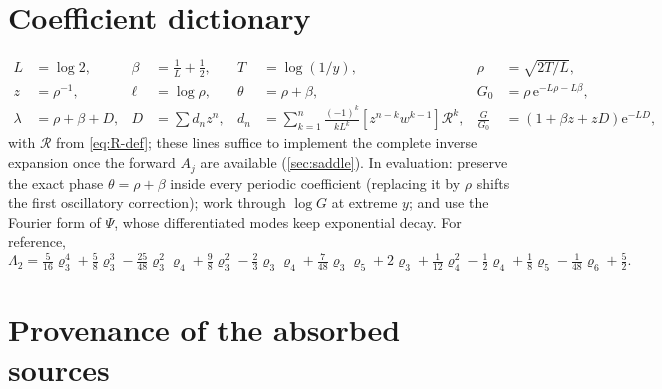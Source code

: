\documentclass[11pt,oneside]{article}
\numberwithin{equation}{section}
\theoremstyle{definition}
\theoremstyle{remark}
\newcommand{\e}{\mathrm e}
\newcommand{\Gzero}{G_0}
\begin{document}
\section{Coefficient dictionary}
\label{app:dictionary}

\begin{align*}
 L&=\log2,
 &\beta&=\tfrac1L+\tfrac12,
 &T&=\log(1/y),
 &\rho&=\sqrt{2T/L},\\
 z&=\rho^{-1},
 &\ell&=\log\rho,
 &\theta&=\rho+\beta,
 &\Gzero&=\rho\,\e^{-L\rho-L\beta},\\
 \lambda&=\rho+\beta+D,
 &D&=\textstyle\sum d_nz^{n},
 &d_n&=\textstyle\sum_{k=1}^{n}\frac{(-1)^{k}}{kL^{k}}
 [z^{n-k}w^{k-1}]\mathcal R^{k},
 &\tfrac G{\Gzero}&=(1+\beta z+zD)\e^{-LD},
\end{align*}
with $\mathcal R$ from \eqref{eq:R-def}; these lines suffice to
implement the complete inverse expansion once the forward
$A_j$ are available (\cref{sec:saddle}).  In evaluation: preserve the
exact phase $\theta=\rho+\beta$ inside every periodic coefficient
(replacing it by $\rho$ shifts the first oscillatory correction);
work through $\log G$ at extreme $y$; and use the Fourier form of
$\Psi$, whose differentiated modes keep exponential decay.  For
reference,
\begin{equation}
 \Lambda_2=\tfrac5{16}\varrho_3^{4}+\tfrac58\varrho_3^{3}
 -\tfrac{25}{48}\varrho_3^{2}\varrho_4+\tfrac98\varrho_3^{2}
 -\tfrac23\varrho_3\varrho_4+\tfrac7{48}\varrho_3\varrho_5
 +2\varrho_3+\tfrac1{12}\varrho_4^{2}-\tfrac12\varrho_4
 +\tfrac18\varrho_5-\tfrac1{48}\varrho_6+\tfrac52.
 \label{eq:Lambda2-expanded}
\end{equation}

\section{Provenance of the absorbed sources}
\label{sec:provenance-inv}
\end{document}
